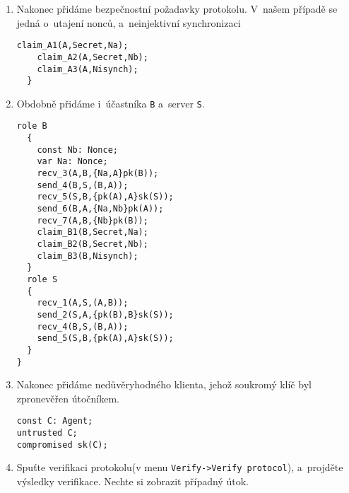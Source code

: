 \begin{enumerate}
  \item Nakonec přidáme bezpečnostní požadavky protokolu. V~našem případě se jedná o~utajení nonců, a~neinjektivní synchronizaci
  \begin{lstlisting}[name=NSPK]
    claim_A1(A,Secret,Na);
    claim_A2(A,Secret,Nb);
    claim_A3(A,Nisynch);
  }
  \end{lstlisting}

  \item Obdobně přidáme i~účastníka \texttt{B} a~server \texttt{S}.
  \begin{lstlisting}[name=NSPK]
  role B
  {
    const Nb: Nonce;
    var Na: Nonce;
    recv_3(A,B,{Na,A}pk(B));
    send_4(B,S,(B,A));
    recv_5(S,B,{pk(A),A}sk(S));
    send_6(B,A,{Na,Nb}pk(A));
    recv_7(A,B,{Nb}pk(B));
    claim_B1(B,Secret,Na);
    claim_B2(B,Secret,Nb);
    claim_B3(B,Nisynch);
  }
  role S
  {
    recv_1(A,S,(A,B));
    send_2(S,A,{pk(B),B}sk(S));
    recv_4(B,S,(B,A));
    send_5(S,B,{pk(A),A}sk(S));
  }
}
  \end{lstlisting}

  \item Nakonec přidáme nedůvěryhodného klienta, jehož soukromý klíč byl zpronevěřen útočníkem.
  \begin{lstlisting}[name=NSPK]
const C: Agent;
untrusted C;
compromised sk(C);
  \end{lstlisting}

  \item Spuťte verifikaci protokolu(v menu \texttt{Verify->Verify protocol}), a~projděte výsledky verifikace. Nechte
  si zobrazit případný útok.
\end{enumerate}
